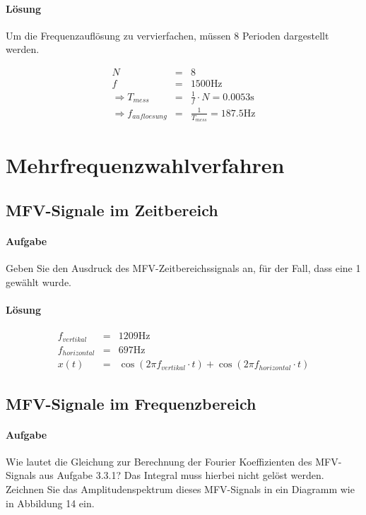 \documentclass[10pt]{scrreprt}
\begin{document}
        \paragraph{Lösung}
        Um die Frequenzauflösung zu vervierfachen, müssen 8 Perioden dargestellt werden.

        \begin{eqnarray*}
            N &=& 8\\
            f &=& 1500\si{\hertz}\\
            \Rightarrow T_{mess} &=& \frac{1}{f} \cdot N =  0.0053\si{\second}\\
            \Rightarrow f_{aufloesung} &=& \frac{1}{T_{mess}} = 187.5 \si{\hertz}
        \end{eqnarray*}

        \section{Mehrfrequenzwahlverfahren}
        \subsection{MFV-Signale im Zeitbereich}
        \paragraph{Aufgabe}
        Geben Sie den Ausdruck des MFV-Zeitbereichssignals an, für der Fall, dass eine \glqq{}1\grqq{}
        gewählt wurde.

        \paragraph{Lösung}

        \begin{eqnarray*}
            f_{vertikal} &=& 1209 \si{\hertz}\\
            f_{horizontal} &=& 697 \si{\hertz}\\
            x(t) &=& \cos(2 \pi f_{vertikal} \cdot t) + \cos(2 \pi f_{horizontal} \cdot t)
        \end{eqnarray*}

        \subsection{MFV-Signale im Frequenzbereich}
        \paragraph{Aufgabe}
        Wie lautet die Gleichung zur Berechnung der Fourier Koeffizienten des MFV-Signals aus
        Aufgabe 3.3.1? Das Integral muss hierbei nicht gelöst werden. Zeichnen Sie das Amplitudenspektrum
        dieses MFV-Signals in ein Diagramm wie in Abbildung 14 ein.
\end{document}
